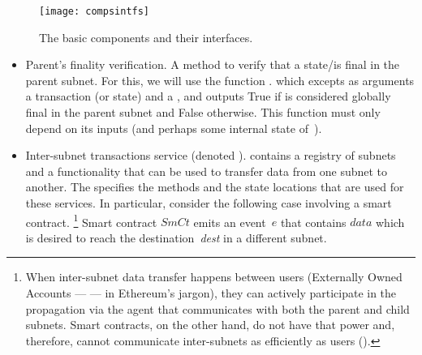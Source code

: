 \begin{figure}[h]
     \centering
     \texttt{[image: compsintfs]}
     \caption{The basic components and their interfaces.}
     \label{fig:interfaces}
 \end{figure}


\begin{itemize}
    \item Parent's finality verification. A method to verify that a state/\tx is final in the parent subnet. For this, we will use the function \gw.\verifyPfinal{\tx}{\prf} which excepts as arguments a transaction (or state) and a \prf, and outputs True if \tx is considered globally final in the parent subnet and False otherwise. This function must only depend on its inputs (and perhaps some internal state of~\gw).
    \item Inter-subnet transactions service (denoted \postoffice). 
    \gw contains a registry of subnets and a functionality that can be used to transfer data from one subnet to another. 
    The \postoffice specifies the methods and the state locations that are used for these services.
    In particular, consider the following case involving a smart contract.%
    \footnote{When inter-subnet data transfer happens between users (Externally Owned Accounts --- \eoa --- in Ethereum's jargon), they can actively participate in the propagation via the \ipc agent that communicates with both the parent and child subnets. Smart contracts, on the other hand, do not have that power and, therefore, cannot communicate inter-subnets as efficiently as users (\eoa).}
    Smart contract $\textit{SmCt}$ emits an event~$e$ that contains $\textit{data}$ which is desired to reach the destination~\textit{dest} in a different subnet.
\end{itemize}
 
 
 